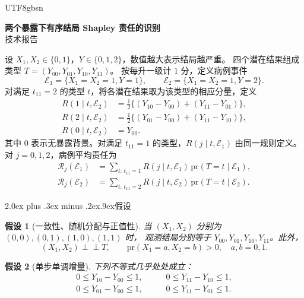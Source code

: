 \documentclass[11pt,a4paper]{article}
\makeatletter
\newcommand{\headingweight}{\ifPDFTeX\mdseries\else\bfseries\fi}
\renewcommand{\section}{\@startsection{section}{1}{0pt}
  {2.0ex plus .3ex minus .2ex}{.9ex}{\normalfont\large\headingweight}}
\newcommand{\indep}{\mathrel{\perp\!\!\!\perp}}
\theoremstyle{report}
\newtheorem{assumption}{假设}
\makeatother
\begin{document}
\ifPDFTeX\begin{CJK*}{UTF8}{gbsn}\fi
\begin{center}
{\LARGE\headingweight 两个暴露下有序结局 Shapley 责任的识别}\\[5pt]
{\large 技术报告}
\end{center}

设 $X_1,X_2\in\{0,1\}$，$Y\in\{0,1,2\}$，数值越大表示结局越严重。
四个潜在结果组成类型 $T=(Y_{00},Y_{01},Y_{10},Y_{11})$。
按每升一级计 $1$ 分，定义病例事件
\[
\mathcal E_1=\{X_1=X_2=1,Y=1\},\qquad
\mathcal E_2=\{X_1=X_2=1,Y=2\}.
\]
对满足 $t_{11}=2$ 的类型 $t$，将各潜在结果取为该类型的相应分量，定义
\begin{equation}
\begin{aligned}
R(1\mid t,\mathcal E_2)&=\tfrac12\{(Y_{10}-Y_{00})+(Y_{11}-Y_{01})\},\\
R(2\mid t,\mathcal E_2)&=\tfrac12\{(Y_{01}-Y_{00})+(Y_{11}-Y_{10})\},\\
R(0\mid t,\mathcal E_2)&=Y_{00}.
\end{aligned}
\label{eq:responsibility}
\end{equation}
其中 $0$ 表示无暴露背景。对满足 $t_{11}=1$ 的类型，$R(j\mid t,\mathcal E_1)$
由同一规则定义。对 $j=0,1,2$，病例平均责任为
\begin{equation}
\begin{aligned}
\mathcal R_j(\mathcal E_1)
 &=\sum_{t:\,t_{11}=1}R(j\mid t,\mathcal E_1)\,
     \mathrm{pr}(T=t\mid\mathcal E_1),\\
\mathcal R_j(\mathcal E_2)
 &=\sum_{t:\,t_{11}=2}R(j\mid t,\mathcal E_2)\,
     \mathrm{pr}(T=t\mid\mathcal E_2).
\end{aligned}
\label{eq:target}
\end{equation}

\section{假设}
\begin{assumption}[一致性、随机分配与正值性]\label{ass:observed}
当 $(X_1,X_2)$ 分别为 $(0,0),(0,1),(1,0),(1,1)$ 时，
观测结局分别等于 $Y_{00},Y_{01},Y_{10},Y_{11}$。此外，
\[
(X_1,X_2)\indep T,\qquad
\mathrm{pr}(X_1=a,X_2=b)>0,\quad a,b=0,1.
\]
\end{assumption}

\begin{assumption}[单步单调增量]\label{ass:unit}
下列不等式几乎处处成立：
\begin{equation}
\begin{aligned}
0\le Y_{10}-Y_{00}\le1,\qquad&0\le Y_{11}-Y_{10}\le1,\\
0\le Y_{01}-Y_{00}\le1,\qquad&0\le Y_{11}-Y_{01}\le1.
\end{aligned}
\label{eq:unit}
\end{equation}
\end{assumption}


\end{CJK*}
\end{document}

